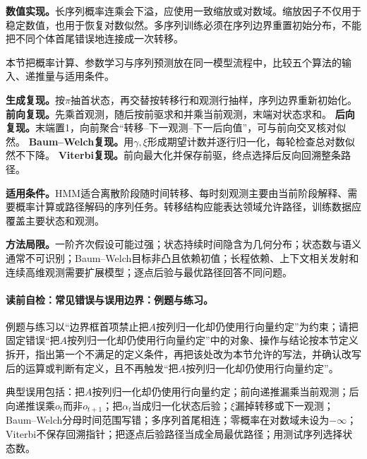 \textbf{数值实现。}长序列概率连乘会下溢，应使用一致缩放或对数域。缩放因子不仅用于稳定数值，也用于恢复对数似然。多序列训练必须在序列边界重置初始分布，不能把不同个体首尾错误地连接成一次转移。


本节把概率计算、参数学习与序列预测放在同一模型流程中，比较五个算法的输入、递推量与适用条件。

\label{replay:V3-C05-S07-SLM-10-01-004}
\textbf{生成复现。}按$\pi$抽首状态，再交替按转移行和观测行抽样，序列边界重新初始化。
\label{replay:V3-C05-S07-SLM-10-02-004}
\textbf{前向复现。}先乘首观测，随后按前驱求和并乘当前观测，末端对状态求和。
\label{replay:V3-C05-S07-SLM-10-03-002}
\textbf{后向复现。}末端置1，向前聚合“转移--下一观测--下一后向值”，可与前向交叉核对似然。
\label{replay:V3-C05-S07-SLM-10-04-001}
\textbf{Baum--Welch复现。}用$\gamma,\xi$形成期望计数并逐行归一化，每轮检查总对数似然不下降。
\label{replay:V3-C05-S07-SLM-10-05-001}
\textbf{Viterbi复现。}前向最大化并保存前驱，终点选择后反向回溯整条路径。

\label{struct:V3-C05-CH28}
\label{struct:V3-C05-CH29}
\begin{applicabilitybox}
\textbf{适用条件。}HMM适合离散阶段随时间转移、每时刻观测主要由当前阶段解释、需要概率计算或路径解码的序列任务。转移结构应能表达领域允许路径，训练数据应覆盖主要状态和观测。

\textbf{方法局限。}一阶齐次假设可能过强；状态持续时间隐含为几何分布；状态数与语义通常不可识别；Baum--Welch目标非凸且依赖初值；长程依赖、上下文相关发射和连续高维观测需要扩展模型；逐点后验与最优路径回答不同问题。
\end{applicabilitybox}

\label{struct:V3-C05-CH30}
\paragraph{读前自检：常见错误与误用边界：例题与练习。}例题与练习以“边界框首项禁止把$A$按列归一化却仍使用行向量约定”为约束；请把固定错误“把$A$按列归一化却仍使用行向量约定”中的对象、操作与结论按本节定义拆开，指出第一个不满足的定义条件，再把该处改为本节允许的写法，并确认改写后的运算或判断有定义，且不再触发“把$A$按列归一化却仍使用行向量约定”。\par

\begin{warningbox}
典型误用包括：把$A$按列归一化却仍使用行向量约定；前向递推漏乘当前观测；后向递推误乘$o_t$而非$o_{t+1}$；把$\alpha_t$当成归一化状态后验；$\xi$漏掉转移或下一观测；Baum--Welch分母时间范围写错；多序列首尾相连；零概率在对数域未设为$-\infty$；Viterbi不保存回溯指针；把逐点后验路径当成全局最优路径；用测试序列选择状态数。
\end{warningbox}

